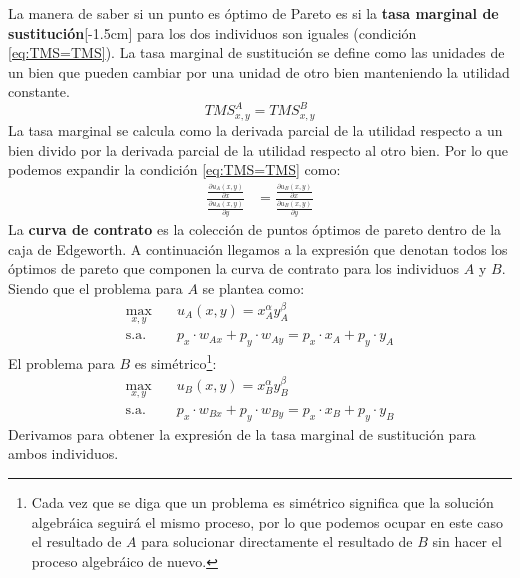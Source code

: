La manera de saber si un punto es óptimo de Pareto es si la \textbf{tasa marginal de sustitución}[-1.5cm] para los dos individuos son iguales (condición \ref{eq:TMS=TMS}). La tasa marginal de sustitución se define como las unidades de un bien que pueden cambiar por una unidad de otro bien manteniendo la utilidad constante.
\begin{equation}
    TMS_{x,y}^A = TMS_{x,y}^B \label{eq:TMS=TMS}
\end{equation}
La tasa marginal se calcula como la derivada parcial de la utilidad respecto a un bien divido por la derivada parcial de la utilidad respecto al otro bien. Por lo que podemos expandir la condición \ref{eq:TMS=TMS} como: 
\begin{align*}
    \frac{    \frac{\partial u_A(x,y)}{\partial x}       }{      \frac{\partial u_A(x,y)}{\partial y}     } & =  \frac{    \frac{\partial u_B(x,y)}{\partial x}       }{      \frac{\partial u_B(x,y)}{\partial y}     } 
\end{align*}
La \textbf{curva de contrato} es la colección de puntos óptimos de pareto dentro de la caja de Edgeworth. A continuación llegamos a la expresión que denotan todos los óptimos de pareto que componen la curva de contrato para los individuos $A$ y $B$. Siendo que el problema para $A$ se plantea como:
\begin{align*}
    \max_{x,y} &\quad u_A(x,y) = x_A^\alpha y_A^{\beta}\quad \\
    \text{s.a.} &\quad p_x \cdot w_{Ax} + p_y \cdot w_{Ay} = p_x \cdot x_A + p_y \cdot y_A
\end{align*}
El problema para $B$ es simétrico\footnote{Cada vez que se diga que un problema es simétrico significa que la solución algebráica seguirá el mismo proceso, por lo que podemos ocupar en este caso el resultado de $A$ para solucionar directamente el resultado de $B$ sin hacer el proceso algebráico de nuevo.}:
\begin{align*}
    \max_{x,y} &\quad u_B(x,y) = x_B^\alpha y_B^{\beta}\quad \\
    \text{s.a.} &\quad p_x \cdot w_{Bx} + p_y \cdot w_{By} = p_x \cdot x_B + p_y \cdot y_B
\end{align*}
Derivamos para obtener la expresión de la tasa marginal de sustitución para ambos individuos. 
